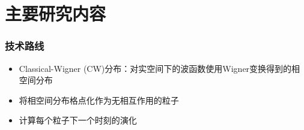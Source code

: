 \documentclass{beamer}
\begin{document}
\section{主要研究内容}

\begin{frame}[t]\frametitle{技术路线}
\vfill
\begin{itemize}
	\item Classical-Wigner (CW)分布：对实空间下的波函数使用Wigner变换得到的相空间分布
	\item 将相空间分布格点化作为无相互作用的粒子
	\item 计算每个粒子下一个时刻的演化
\end{itemize}

\begin{figure}
\end{figure}


\end{frame}
\end{document}
